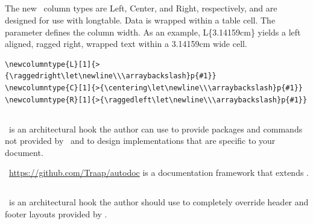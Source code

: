 \documentclass[12pt]{tlc-article}
\begin{document}

\subsection{\tlcNCT}
The new \tlcNCT\ column types are Left, Center, and Right, respectively, and are
designed for use with longtable.  Data is wrapped within a table cell.  The
parameter defines the column width.  As an example, L\{3.14159cm\} yields a left
aligned, ragged right, wrapped text within a 3.14159cm wide cell.

\tlcVspace

\begin{lstlisting}[basicstyle=\ttfamily\tiny]
\newcolumntype{L}[1]{>{\raggedright\let\newline\\\arraybackslash}p{#1}}
\newcolumntype{C}[1]{>{\centering\let\newline\\\arraybackslash}p{#1}}
\newcolumntype{R}[1]{>{\raggedleft\let\newline\\\arraybackslash}p{#1}}
\end{lstlisting}


\subsection{\tlcAL}
\tlcAL\ is an architectural hook the author can use to provide packages and
commands not provided by \tlcA\, and to design implementations that are specific
to your document.

\tlcVspace

\tlcNote\ \url{https://github.com/Traap/autodoc} is a documentation framework
that extends \tlcA.



\subsection{\tlcHF}
\tlcHF\ is an architectural hook the author should use to completely override
header and footer layouts provided by \tlcA.
\end{document}
